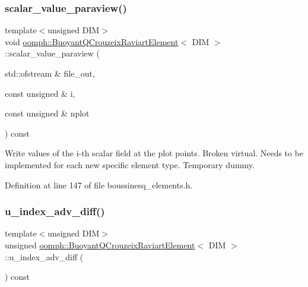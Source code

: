 \subsubsection{\texorpdfstring{scalar\+\_\+value\+\_\+paraview()}{scalar\_value\_paraview()}}
{\footnotesize\ttfamily template$<$unsigned D\+IM$>$ \\
void \hyperlink{classoomph_1_1BuoyantQCrouzeixRaviartElement}{oomph\+::\+Buoyant\+Q\+Crouzeix\+Raviart\+Element}$<$ D\+IM $>$\+::scalar\+\_\+value\+\_\+paraview (\begin{DoxyParamCaption}\item[{std\+::ofstream \&}]{file\+\_\+out,  }\item[{const unsigned \&}]{i,  }\item[{const unsigned \&}]{nplot }\end{DoxyParamCaption}) const\hspace{0.3cm}{\ttfamily [inline]}}



Write values of the i-\/th scalar field at the plot points. Broken virtual. Needs to be implemented for each new specific element type. Temporary dummy. 



Definition at line 147 of file boussinesq\+\_\+elements.\+h.

\mbox{\label{classoomph_1_1BuoyantQCrouzeixRaviartElement_acf5fa44f694c5374c61a964020437bf4}} 
\subsubsection{\texorpdfstring{u\+\_\+index\+\_\+adv\+\_\+diff()}{u\_index\_adv\_diff()}}
{\footnotesize\ttfamily template$<$unsigned D\+IM$>$ \\
unsigned \hyperlink{classoomph_1_1BuoyantQCrouzeixRaviartElement}{oomph\+::\+Buoyant\+Q\+Crouzeix\+Raviart\+Element}$<$ D\+IM $>$\+::u\+\_\+index\+\_\+adv\+\_\+diff (\begin{DoxyParamCaption}{ }\end{DoxyParamCaption}) const\hspace{0.3cm}{\ttfamily [inline]}}



